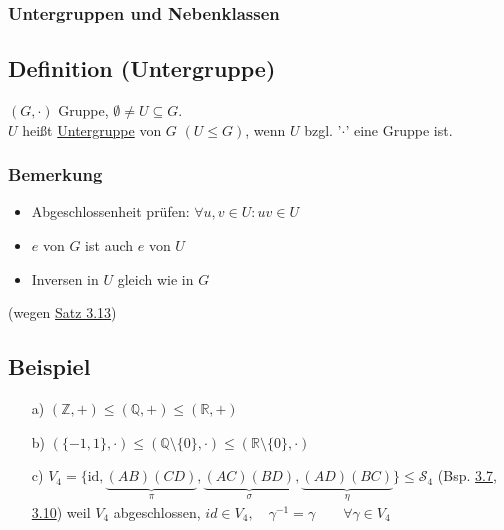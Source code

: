 \documentclass[12pt,titlepage, pdf]{article}
\newcommand{\R}{\mathds{R}}
\newcommand{\uline}[1]{\underline{#1}}
\newcommand{\id}{\textrm{id}}
\renewcommand{\>}{\rightarrow}
\renewcommand{\*}{\cdot}
\begin{document}
	      \subsubsection*{Untergruppen und Nebenklassen}
	      \subsection{Definition (Untergruppe)}
	      $(G, \cdot)$ Gruppe, $\emptyset \neq U \subseteq G$.\\
	      $U$ heißt \uline{Untergruppe} von $G$ $(U \leq G)$, wenn $U$ bzgl. '$\cdot$' eine Gruppe ist.
	      	
	      \subsubsection*{Bemerkung}
	      \begin{itemize}
	      	\item Abgeschlossenheit prüfen: $\forall u,v  \in U: uv \in U$
	      	\item $e$ von $G$ ist auch $e$ von $U$
	      	\item Inversen in $U$ gleich wie in $G$
	      \end{itemize}
	      (wegen \hyperref[3.13]{Satz 3.13})
	      \subsection{Beispiel}
	      \label{3.16}
	      \begin{itemize}
	      	\item[a)] $(\mathds{Z}, +) \leq (\mathds{Q}, + ) \leq (\R, + )$
	      	\item[b)] $(\{-1,1\}, \cdot) \leq (\mathds{Q}\setminus \{0\}, \cdot) \leq (\R \setminus\{0\}, \cdot)$
	      	\item[c)] $V_4 = \{\id,\underbrace{(AB)(CD)}_{\pi},\underbrace{(AC)(BD)}_{\sigma}, \underbrace{(AD)(BC)}_{\eta}\} \leq \mathscr{S}_4$ (Bsp. \hyperref[3.7]{3.7}, \hyperref[3.10]{3.10}) weil $V_4$ abgeschlossen, $id \in V_4,\quad \gamma^{-1} = \gamma \qquad \forall \gamma \in V_4$
	      \end{itemize}
\end{document}
